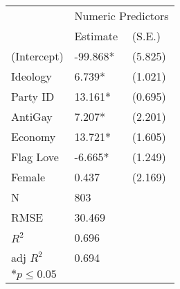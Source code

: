\begin{tabular}{*{3}{l}}
 \hline
                &\multicolumn{2}{c}{Numeric Predictors}   \\
                &Estimate &(S.E.) \\
 \hline
 \hline
  (Intercept)    & -99.868*  &   (5.825) \\
  Ideology       &  6.739*  &   (1.021) \\
  Party ID       &  13.161*  &   (0.695) \\
  AntiGay        &  7.207*  &   (2.201) \\
  Economy        &  13.721*  &   (1.605) \\
  Flag Love      & -6.665*  &   (1.249) \\
  Female         &  0.437  &   (2.169) \\
 \hline 
 N                &803      &       \\
 RMSE            &30.469        & \\
 $R^2$           &0.696        & \\
 adj $R^2$       &0.694        & \\
 \hline
 \hline
 
 \multicolumn{2}{l}{${*}  p \le 0.05$   }\\
 \end{tabular}